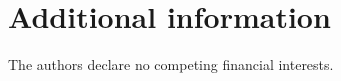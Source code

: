 \section*{Additional information}

The authors declare no competing financial interests.

\renewcommand{\thefigure}{S\arabic{figure}}
\renewcommand{\figurename}{Supplementary Figure}